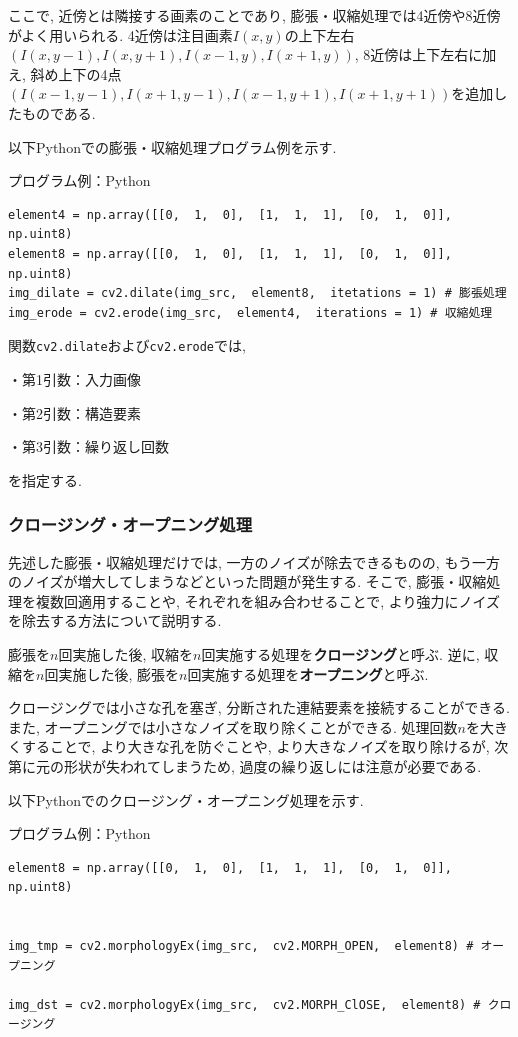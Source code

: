 \documentclass[dvipdfmx]{jsarticle}
\begin{document}
ここで, 近傍とは隣接する画素のことであり, 膨張・収縮処理では4近傍や8近傍がよく用いられる.
4近傍は注目画素$I(x, y)$の上下左右$(I(x, y-1),  I(x, y+1),  I(x-1, y),  I(x+1, y))$, 8近傍は上下左右に加え, 斜め上下の4点$(I(x-1, y-1),  I(x+1, y-1),  I(x-1, y+1),  I(x+1, y+1))$を追加したものである.

以下Pythonでの膨張・収縮処理プログラム例を示す.

プログラム例：Python
\begin{lstlisting}
element4 = np.array([[0,  1,  0],  [1,  1,  1],  [0,  1,  0]],  np.uint8)
element8 = np.array([[0,  1,  0],  [1,  1,  1],  [0,  1,  0]],  np.uint8)
img_dilate = cv2.dilate(img_src,  element8,  itetations = 1) # 膨張処理
img_erode = cv2.erode(img_src,  element4,  iterations = 1) # 収縮処理
\end{lstlisting}

関数\verb|cv2.dilate|および\verb|cv2.erode|では, 


・第1引数：入力画像

・第2引数：構造要素

・第3引数：繰り返し回数


を指定する.


\subsubsection{クロージング・オープニング処理}
先述した膨張・収縮処理だけでは, 一方のノイズが除去できるものの, もう一方のノイズが増大してしまうなどといった問題が発生する.
そこで, 膨張・収縮処理を複数回適用することや, それぞれを組み合わせることで, より強力にノイズを除去する方法について説明する.

膨張を$n$回実施した後, 収縮を$n$回実施する処理を\textbf{クロージング}と呼ぶ.
逆に, 収縮を$n$回実施した後, 膨張を$n$回実施する処理を\textbf{オープニング}と呼ぶ.

クロージングでは小さな孔を塞ぎ, 分断された連結要素を接続することができる.
また, オープニングでは小さなノイズを取り除くことができる.
処理回数$n$を大きくすることで, より大きな孔を防ぐことや, より大きなノイズを取り除けるが, 次第に元の形状が失われてしまうため, 過度の繰り返しには注意が必要である.

以下Pythonでのクロージング・オープニング処理を示す.

プログラム例：Python
\begin{lstlisting}
element8 = np.array([[0,  1,  0],  [1,  1,  1],  [0,  1,  0]],  np.uint8)


img_tmp = cv2.morphologyEx(img_src,  cv2.MORPH_OPEN,  element8) # オープニング

img_dst = cv2.morphologyEx(img_src,  cv2.MORPH_ClOSE,  element8) # クロージング
\end{lstlisting}
\end{document}
